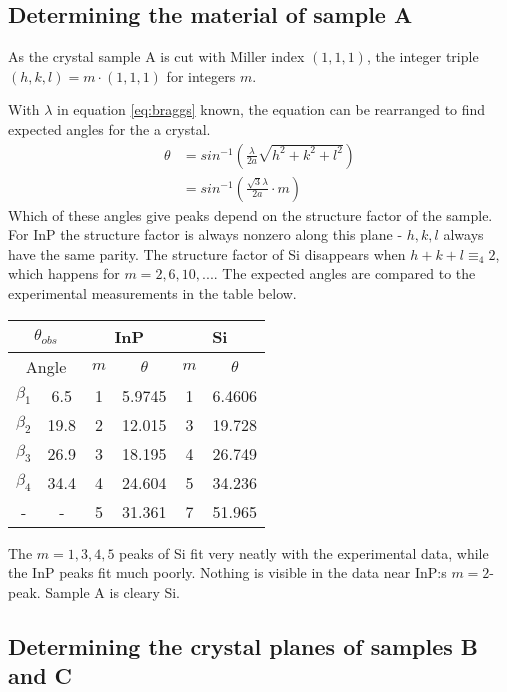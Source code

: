 \documentclass[a4paper,twoside=false,abstract=false,numbers=noenddot,
titlepage=false,headings=small,parskip=half,version=last]{scrartcl}
\begin{document}
\subsection{Determining the material of sample A}

As the crystal sample A is cut with Miller index $(1,1,1)$,
the integer triple $(h,k,l)=m\cdot (1,1,1)$ for integers $m$.

With $\lambda$ in equation \eqref{eq:braggs} known, the equation can be rearranged to find expected angles for the a crystal.
\begin{align}
\label{eq:braggangle}
\theta&=sin^{-1}\left( \frac{\lambda}{2a} \sqrt{h^2+k^2+l^2}\right)\\
&=sin^{-1}\left( \frac{\sqrt{3}\lambda}{2a} \cdot m\right)\nonumber
\end{align}
Which of these angles give peaks depend on the structure factor of the sample.
For InP the structure factor is always nonzero along this plane - $h,k,l$ always have the same parity.
The structure factor of Si disappears when $h+k+l\equiv_4 2$, which happens for $m=2,6,10,...$.
The expected angles are compared to the experimental measurements in the table below.

\begin{tabular}{ |c|c|c|c|c|c| }
    \hline
    \multicolumn{2}{|c|}{$\theta_{obs}$}
	& \multicolumn{2}{|c|}{InP}
	& \multicolumn{2}{|c|}{Si}\\
    \hline
	\multicolumn{2}{|c|}{Angle}& $m$ & $\theta$ & $m$ & $\theta$ \\
	\hline
    $\beta_1$	& 6.5\degree	& 1 & 5.9745\degree & 1	& 6.4606\degree	\\
    $\beta_2$	& 19.8\degree	& 2 & 12.015\degree & 3	& 19.728\degree	\\
    $\beta_3$	& 26.9\degree	& 3 & 18.195\degree & 4	& 26.749\degree	\\
    $\beta_4$	& 34.4\degree	& 4 & 24.604\degree & 5	& 34.236\degree	\\
    -			& -				& 5 & 31.361\degree & 7	& 51.965\degree	\\
	\hline
\end{tabular}

The $m=1,3,4,5$ peaks of Si fit very neatly with the experimental data, while the InP peaks fit much poorly.
Nothing is visible in the data near InP:s $m=2$-peak.
Sample A is cleary Si.

\subsection{Determining the crystal planes of samples B and C}
\end{document}
